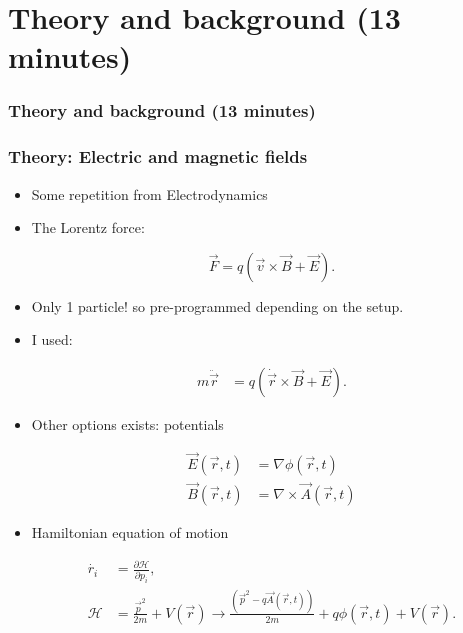 \documentclass{beamer}
\begin{document}
\section{Theory and background (13 minutes)}

\begin{frame}
\frametitle{Theory and background (13 minutes)}
\tableofcontents[currentsection]
\end{frame}



\begin{frame}
\frametitle{Theory: Electric and magnetic fields}
\begin{itemize}
\item<1-> Some repetition from Electrodynamics
\item<2-> The Lorentz force:

\begin{equation*}
\vec{F} = q ( \vec{v}\times \vec{B}+\vec{E}).
\end{equation*}


\item<3-> Only 1 particle! so pre-programmed depending on the setup.
\end{itemize}
\end{frame}

\begin{frame}
\begin{itemize}
\frametitle{Theory: Alternative approach}

\item<1-> I used:

\begin{align*}
m \ddot{\vec{r}} &= q ( \dot{\vec{r}}\times \vec{B}+\vec{E}).
\end{align*}

\item<2-> Other options exists: potentials

\begin{align*}
\vec{E}(\vec{r},t) &= \nabla \phi(\vec{r},t)\\
\vec{B}(\vec{r},t) &= \nabla \times \vec{A}(\vec{r},t)
\end{align*}

\item<3-> Hamiltonian equation of motion

\begin{align*}
\dot{r_i} &= \frac{\partial \mathcal{H}}{\partial p_i},\\
\mathcal{H} &= \frac{\vec{p}^2}{2m}+V(\vec{r}) \rightarrow \frac{(\vec{p}^2-q\vec{A}(\vec{r},t))}{2m}+q\phi(\vec{r},t)+V(\vec{r}).
\end{align*}

\end{itemize}
\end{frame}
\end{document}
